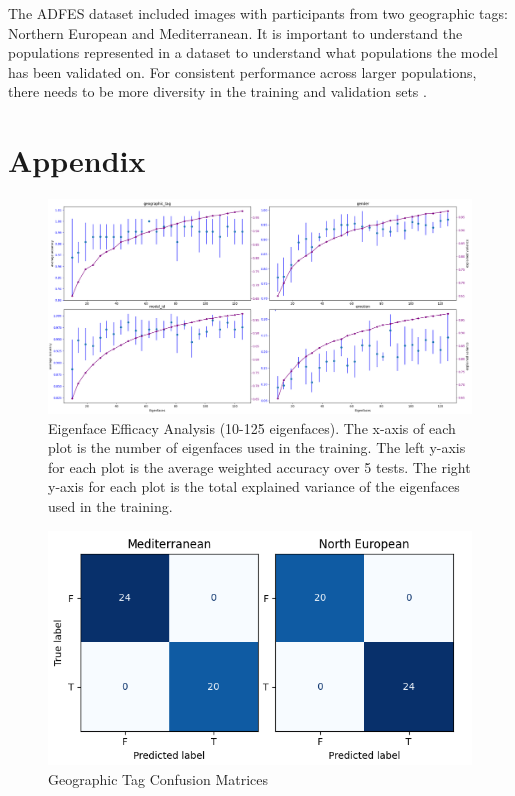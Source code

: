 \documentclass[journal]{new-aiaa}
\begin{document}
The ADFES dataset included images with participants from two geographic tags: Northern European and Mediterranean.
It is important to understand the populations represented in a dataset to understand what populations the model has been validated on.
For consistent performance across larger populations, there needs to be more diversity in the training and validation sets \cite{zou2018ai}.

\section*{Appendix}\label{sec:Appendix}

\begin{figure}[H]
  \centering
  \includegraphics[width=\textwidth]{figures/eigenface_analysis_10_125.png}
  \caption{Eigenface Efficacy Analysis (10-125 eigenfaces). The x-axis of each plot is the number of eigenfaces used in the training. The left y-axis for each plot is the average weighted accuracy over 5 tests. The right y-axis for each plot is the total explained variance of the eigenfaces used in the training.}
  \label{fig:EEA1}
\end{figure}

\begin{figure}[H]
  \centering
  \includegraphics[width=.7\textwidth]{figures/geographic_tag_cm.png}
  \caption{Geographic Tag Confusion Matrices}
  \label{fig:Geographic Confusion Matrices}
\end{figure}
\end{document}

